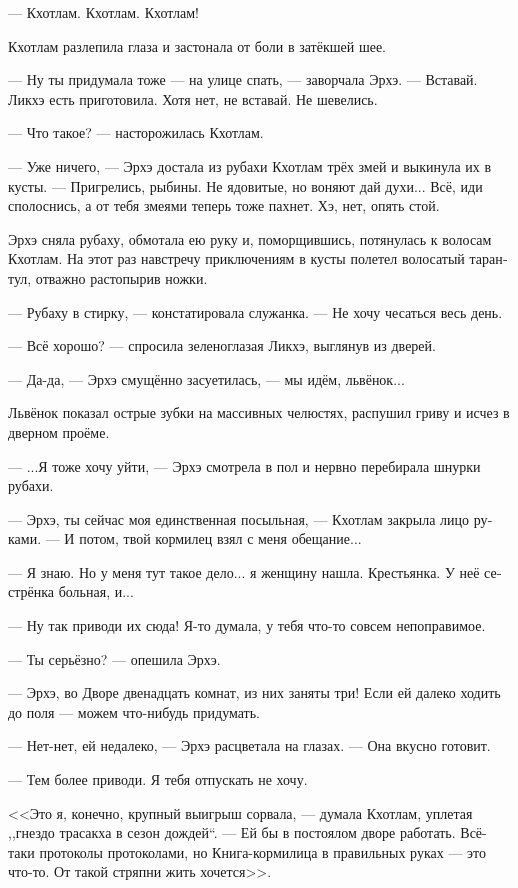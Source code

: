 \documentclass[a4paper,12pt,fleqn]{book}\usepackage{polyglossia}\setdefaultlanguage[babelshorthands=true]{russian}\setotherlanguage{english}\defaultfontfeatures{Ligatures=TeX,Mapping=tex-text}\usepackage{xcolor}\newcommand{\ml}[3]{#2}
\newcommand{\asterism}{\vspace{1em}{\centering\Large\bfseries$\ast~\ast~\ast$\par}\vspace{1em}}
\begin{document}
\asterism

--- Кхотлам.
Кхотлам.
Кхотлам!

Кхотлам разлепила глаза и застонала от боли в затёкшей шее.

--- Ну ты придумала тоже --- на улице спать, --- заворчала Эрхэ.
--- Вставай.
Ликхэ есть приготовила.
Хотя нет, не вставай.
Не шевелись.

--- Что такое? --- насторожилась Кхотлам.

--- Уже ничего, --- Эрхэ достала из рубахи Кхотлам трёх змей и выкинула их в кусты.
--- Пригрелись, рыбины.
Не ядовитые, но воняют дай духи...
Всё, иди сполоснись, а от тебя змеями теперь тоже пахнет.
Хэ, нет, опять стой.

Эрхэ сняла рубаху, обмотала ею руку и, поморщившись, потянулась к волосам Кхотлам.
На этот раз навстречу приключениям в кусты полетел волосатый тарантул, отважно растопырив ножки.

--- Рубаху в стирку, --- констатировала служанка.
--- Не хочу чесаться весь день.

--- Всё хорошо? --- спросила зеленоглазая Ликхэ, выглянув из дверей.

--- Да-да, --- Эрхэ смущённо засуетилась, --- мы идём, львёнок...

Львёнок показал острые зубки на массивных челюстях, распушил гриву и исчез в дверном проёме.

--- ...Я тоже хочу уйти, --- Эрхэ смотрела в пол и нервно перебирала шнурки рубахи.

--- Эрхэ, ты сейчас моя единственная посыльная, --- Кхотлам закрыла лицо руками.
--- И потом, твой кормилец взял с меня обещание...

--- Я знаю.
Но у меня тут такое дело... я женщину нашла.
Крестьянка.
У неё сестрёнка больная, и...

--- Ну так приводи их сюда!
Я-то думала, у тебя что-то совсем непоправимое.

--- Ты серьёзно? --- опешила Эрхэ.

--- Эрхэ, во Дворе двенадцать комнат, из них заняты три!
Если ей далеко ходить до поля --- можем что-нибудь придумать.

--- Нет-нет, ей недалеко, --- Эрхэ расцветала на глазах.
--- Она вкусно готовит.

--- Тем более приводи.
Я тебя отпускать не хочу.

<<Это я, конечно, крупный выигрыш сорвала, --- думала Кхотлам, уплетая ,,гнездо трасакха в сезон дождей``.
--- Ей бы в постоялом дворе работать.
Всё-таки протоколы протоколами, но Книга-кормилица в правильных руках --- это что-то.
От такой стряпни жить хочется>>.
\end{document}

